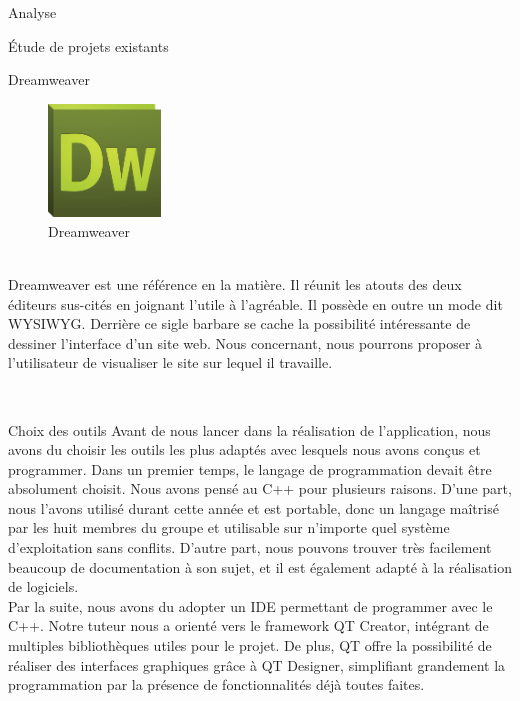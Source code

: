 \documentclass[a4paper, 12pt]{report}
\begin{document}
\begin{part}{Analyse}
\begin{chapter}{Étude de projets existants}
			~\\
			\begin{section}{Dreamweaver}
				\begin{figure}[h]
					\begin{center}
						\includegraphics[width=3cm]{images/logoDreamweaver.png}
						\caption{Dreamweaver}
					\end{center}
				\end{figure}~\\
				Dreamweaver est une référence en la matière. Il réunit les atouts des deux éditeurs sus-cités en joignant l'utile à l'agréable.
				Il possède en outre un mode dit WYSIWYG. Derrière ce sigle barbare se cache la possibilité intéressante de dessiner l'interface d'un site web.
				Nous concernant, nous pourrons proposer à l'utilisateur de visualiser le site sur lequel il travaille.
			\end{section}
			~\\
		\end{chapter}
		\begin{chapter}{Choix des outils}
		Avant de nous lancer dans la réalisation de l'application, nous avons du choisir les outils les plus adaptés avec lesquels nous avons conçus et programmer. Dans un premier temps, le langage de programmation devait être absolument choisit. Nous avons pensé au C++ pour plusieurs raisons. D'une part, nous l'avons utilisé durant cette année et est portable, donc un langage maîtrisé par les huit membres du groupe et utilisable sur n'importe quel système d'exploitation sans conflits. D'autre part, nous pouvons trouver très facilement beaucoup de documentation à son sujet, et il est également adapté à la réalisation de logiciels. %
		\\
		Par la suite, nous avons du adopter un IDE permettant de programmer avec le C++. Notre tuteur nous a orienté vers le framework QT Creator, intégrant de multiples bibliothèques utiles pour le projet. De plus, QT offre la possibilité de réaliser des interfaces graphiques grâce à QT Designer, simplifiant grandement la programmation par la présence de fonctionnalités déjà toutes faites.%
		\\

\end{chapter}
\end{part}
\end{document}
